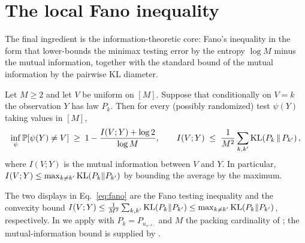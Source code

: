 \section{The local Fano inequality}\label{sec:fano}

The final ingredient is the information-theoretic core: Fano's inequality in
the form that lower-bounds the minimax testing error by the entropy
$\log M$ minus the mutual information, together with the standard bound of the
mutual information by the pairwise KL diameter.

\begin{lemma}\label{lem:fano}
Let $M\ge 2$ and let $V$ be uniform on $[M]$. Suppose that conditionally on
$V=k$ the observation $Y$ has law $P_k$. Then for every (possibly randomized)
test $\psi(Y)$ taking values in $[M]$,
\begin{align}\label{eq:fano}
\inf_{\psi}\mathbb{P}\!\left[\psi(Y)\ne V\right]
\;\ge\; 1 - \frac{I(V;Y)+\log 2}{\log M},
\qquad
I(V;Y)\;\le\;\frac{1}{M^2}\sum_{k,k'}\mathrm{KL}\!\left(P_{k}\,\middle\|\,P_{k'}\right),
\end{align}
where $I(V;Y)$ is the mutual information between $V$ and $Y$. In particular,
$I(V;Y)\le\max_{k\ne k'}\mathrm{KL}(P_{k}\|P_{k'})$ by bounding the average by the
maximum.
\end{lemma}

\begin{remark}\label{rem:fano}
The two displays in Eq.~\eqref{eq:fano} are the Fano testing inequality and the
convexity bound
$I(V;Y)\le \tfrac{1}{M^2}\sum_{k,k'}\mathrm{KL}(P_k\|P_{k'})\le\max_{k\ne k'}\mathrm{KL}(P_k\|P_{k'})$,
respectively. In  we apply  with $P_k =
P_{u_{\tau^{(k)}}}$ and $M$ the packing cardinality of ; the
mutual-information bound is supplied by .
\end{remark}

